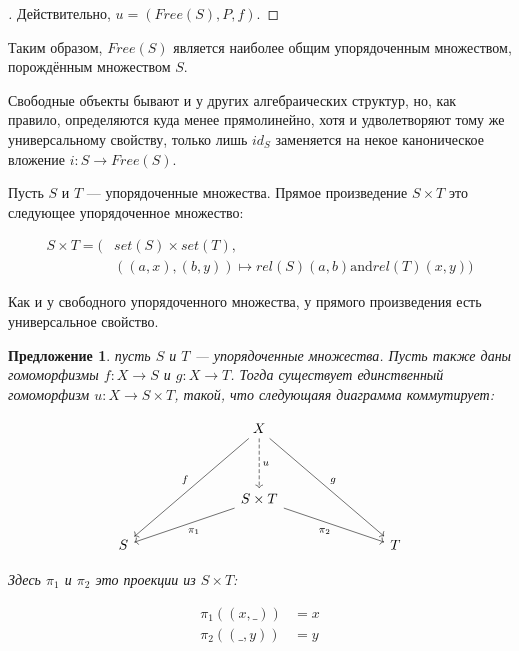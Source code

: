 \documentclass[10pt, a4paper]{article}
\theoremstyle{colon}
\newtheorem*{prop*}{Предложение}
\begin{document}
\begin{proof}[\unskip\indent\nopunct]
Действительно, \( u = (Free(S), P, f) \).
\end{proof}

Таким образом, \( Free(S) \) является наиболее общим упорядоченным множеством, порождённым
множеством \( S \).

Свободные объекты бывают и у других алгебраических структур, но,
как правило, определяются куда менее прямолинейно, хотя и удволетворяют тому же универсальному
свойству, только лишь \( id_S \) заменяется на некое каноническое вложение \( i : S \to Free(S) \).

Пусть \( S \) и \( T \) — упорядоченные множества. Прямое произведение \( S \times T \) это
следующее упорядоченное множество:

\begin{align*}
S \times T = (
&set(S) \times set(T), \\
&((a, x), (b, y)) \mapsto rel(S)(a, b) \mathbin\mathrm{and} rel(T)(x, y))
\end{align*}

Как и у свободного упорядоченного множества, у прямого произведения есть универсальное свойство.

\begin{prop*}
пусть \( S \) и \( T \) — упорядоченные множества.
Пусть также даны гомоморфизмы \( f : X \to S \) и \( g : X \to T \).
Тогда существует единственный гомоморфизм \( u : X \to S \times T \), такой, что
следующаяя диаграмма коммутирует:

\[\begin{tikzcd}
	&&& X \\
	\\
	&&& {S\times T} \\
	S &&&&&& T
	\arrow["u", dashed, from=1-4, to=3-4]
	\arrow["{\pi_1}", from=3-4, to=4-1]
	\arrow["{\pi_2}"', from=3-4, to=4-7]
	\arrow["g", from=1-4, to=4-7]
	\arrow["f"', from=1-4, to=4-1]
\end{tikzcd}\]

Здесь \( \pi_1 \) и \( \pi_2 \) это проекции из \( S \times T \):

\begin{align*}
\pi_1((x, \_)) &= x \\
\pi_2((\_, y)) &= y
\end{align*}

\end{prop*}
\end{document}
